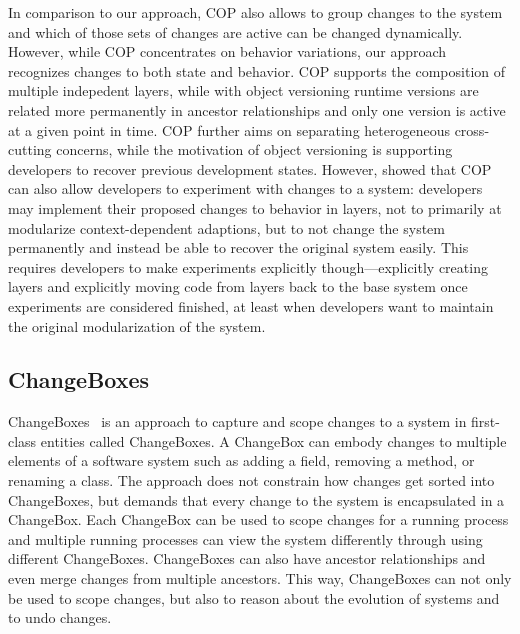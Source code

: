 In comparison to our approach, COP also allows to group changes to the system and which of those sets of changes are active can be changed dynamically.
However, while COP concentrates on behavior variations, our approach recognizes changes to both state and behavior.
COP supports the composition of multiple indepedent layers, while with object versioning runtime versions are related more permanently in ancestor relationships and only one version is active at a given point in time.
COP further aims on separating heterogeneous cross-cutting concerns, while the motivation of object versioning is supporting developers to recover previous development states.
However, \cite{Lincke2012SCS} showed that COP can also allow developers to experiment with changes to a system: developers may implement their proposed changes to behavior in layers, not to primarily at modularize context-dependent adaptions, but to not change the system permanently and instead be able to recover the original system easily.
This requires developers to make experiments explicitly though---explicitly creating layers and explicitly moving code from layers back to the base system once experiments are considered finished, at least when developers want to maintain the original modularization of the system.


\subsection{ChangeBoxes}

ChangeBoxes~\cite{Denker2007EEC} is an approach to capture and scope changes to a system in first-class entities called ChangeBoxes.
A ChangeBox can embody changes to multiple elements of a software system such as adding a field, removing a method, or renaming a class.
The approach does not constrain how changes get sorted into ChangeBoxes, but demands that every change to the system is encapsulated in a ChangeBox.
Each ChangeBox can be used to scope changes for a running process and multiple running processes can view the system differently through using different ChangeBoxes.
ChangeBoxes can also have ancestor relationships and even merge changes from multiple ancestors.
This way, ChangeBoxes can not only be used to scope changes, but also to reason about the evolution of systems and to undo changes.

